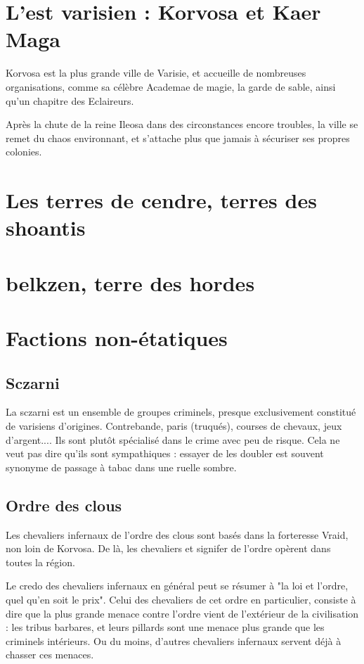 \documentclass[letterpaper,10pt,twoside,twocolumn,openany]{book}
\begin{document}
\section{L'est varisien : Korvosa et Kaer Maga}
Korvosa est la plus grande ville de Varisie, et accueille de nombreuses organisations, comme sa célèbre Academae de magie, la garde de sable, ainsi qu'un chapitre des Eclaireurs. 

Après la chute de la reine Ileosa dans des circonstances encore troubles, la ville se remet du chaos environnant, et s'attache plus que jamais à sécuriser ses propres colonies.

\section{Les terres de cendre, terres des shoantis}
\section{belkzen, terre des hordes}
\section{Factions non-étatiques}
\subsection{Sczarni}
La sczarni est un ensemble de groupes criminels, presque exclusivement constitué de varisiens d'origines. Contrebande, paris (truqués), courses de chevaux, jeux d'argent.... Ils sont plutôt spécialisé dans le crime avec peu de risque. Cela ne veut pas dire qu'ils sont sympathiques : essayer de les doubler est souvent synonyme de passage à tabac dans une ruelle sombre.
\subsection{Ordre des clous}
Les chevaliers infernaux de l'ordre des clous sont basés dans la forteresse Vraid, non loin de Korvosa. De là, les chevaliers et signifer de l'ordre opèrent dans toutes la région.

Le credo des chevaliers infernaux en général peut se résumer à "la loi et l'ordre, quel qu'en soit le prix". Celui des chevaliers de cet ordre en particulier, consiste à dire que la plus grande menace contre l'ordre vient de l'extérieur de la civilisation : les tribus barbares, et leurs pillards sont une menace plus grande que les criminels intérieurs. Ou du moins, d'autres chevaliers infernaux servent déjà à chasser ces menaces.
\end{document}

